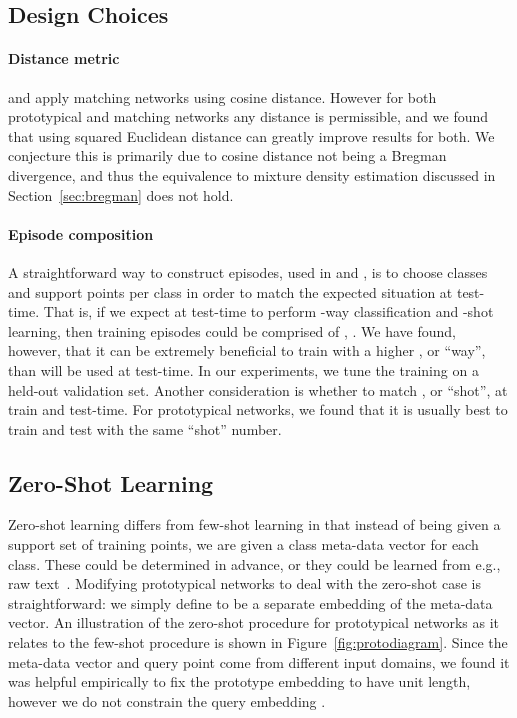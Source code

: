 \documentclass{article}
\begin{document}
\subsection{Design Choices}

\paragraph{Distance metric}
\citet{vinyals2016matching} and \citet{ravi2017meta} apply matching networks using cosine distance.
However for both prototypical and matching networks any distance is permissible, and we found that using squared Euclidean distance can greatly improve results for both. We conjecture this is primarily due to cosine distance not being a Bregman divergence, and thus the equivalence to mixture density estimation discussed in Section~\ref{sec:bregman} does not hold.

\paragraph{Episode composition}
A straightforward way to construct episodes, used in \citet{vinyals2016matching} and \citet{ravi2017meta}, is to choose  classes and  support points per class in order to match the expected situation at test-time. That is, if we expect at test-time to perform -way classification and -shot learning, then training episodes could be comprised of , . We have found, however, that it can be extremely beneficial to train with a higher , or ``way'', than will be used at test-time. In our experiments, we tune the training  on a held-out validation set. Another consideration is whether to match , or ``shot'', at train and test-time.
For prototypical networks, we found that it is usually best to train and test with the same ``shot'' number.

\subsection{Zero-Shot Learning}
Zero-shot learning differs from few-shot learning in that instead of being given a support set of training points, we are given a class meta-data vector  for each class. These could be determined in advance, or they could be learned from e.g., raw text~\citep{elhoseiny2013write}. Modifying prototypical networks to deal with the zero-shot case is straightforward: we simply define  to be a separate embedding of the meta-data vector. An illustration of the zero-shot procedure for prototypical networks as it relates to the few-shot procedure is shown in Figure~\ref{fig:protodiagram}. Since the meta-data vector and query point come from different input domains, we found it was helpful empirically to fix the prototype embedding  to have unit length, however we do not constrain the query embedding .
\end{document}
